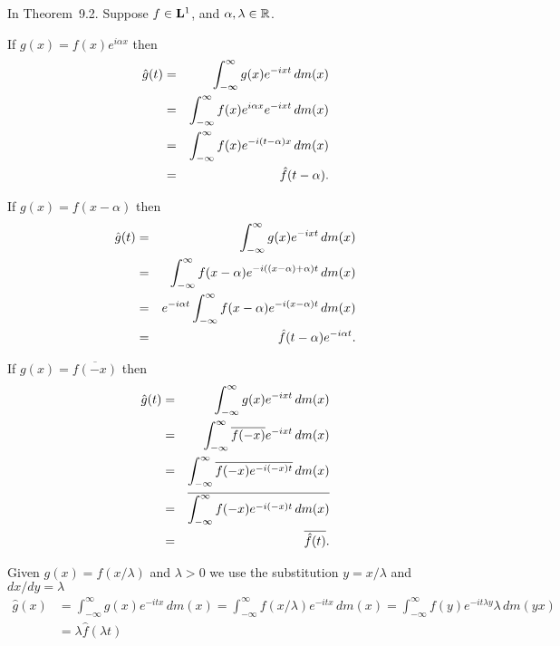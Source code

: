 \newcommand{\sqdivtpi}{\ensuremath{\frac{1}{\sqrt{2\pi}}}}
In Theorem~9.2.
Suppose \(f\in \mathbf{L}^{1}\), and \(\alpha,\lambda \in\mathbb{R}\).
\begin{itemize}

  If \(g(x)=f(x)e^{i\alpha x}\) then
    \begin{eqnarray*}
      \Hat{g}(t)
            & = & \int_{-\infty}^{\infty} g(x)e^{-ixt}\,dm(x) \\
            & = & \int_{-\infty}^{\infty} f(x)e^{i\alpha x}e^{-ixt}\,dm(x) \\
            & = & \int_{-\infty}^{\infty} f(x)e^{-i(t-\alpha)x}\,dm(x) \\
            & = & \Hat{f}(t-\alpha).
    \end{eqnarray*}

   If \(g(x)=f(x-\alpha)\) then
    \begin{eqnarray*}
      \Hat{g}(t)
            & = & \int_{-\infty}^{\infty} g(x)e^{-ixt}\,dm(x) \\
            & = & \int_{-\infty}^{\infty} f(x-\alpha)e^{-i((x-\alpha)+\alpha)t}\,dm(x) \\
            & = & e^{-i\alpha t}\int_{-\infty}^{\infty} f(x-\alpha)e^{-i(x-\alpha)t}\,dm(x) \\
            & = & \Hat{f}(t-\alpha)e^{-i\alpha t}.
    \end{eqnarray*}

   If \(g(x)=\overline{f(-x)}\) then
    \begin{eqnarray*}
      \Hat{g}(t)
            & = & \int_{-\infty}^{\infty} g(x)e^{-ixt}\,dm(x) \\
            & = & \int_{-\infty}^{\infty} \overline{f(-x)}e^{-ixt}\,dm(x) \\
            & = & \int_{-\infty}^{\infty} \overline{f(-x)e^{-i(-x)t}}\,dm(x) \\
            & = & \overline{\int_{-\infty}^{\infty} f(-x)e^{-i(-x)t}\,dm(x)} \\
            & = & \overline{\Hat{f}(t)}.
    \end{eqnarray*}

    Given \(g(x) = f(x/\lambda)\) and \(\lambda>0\)
    we use the substitution \(y=x/\lambda\) and \(dx/dy=\lambda\)
    \begin{align*}
    \widehat{g}(x)
     &= \int_{-\infty}^\infty g(x)e^{-itx}\,dm(x)
     = \int_{-\infty}^\infty f(x/\lambda)e^{-itx}\,dm(x) 
     = \int_{-\infty}^\infty f(y)e^{- it \lambda y}\lambda\,dm(yx) \\
     &= \lambda \widehat{f}(\lambda t)
    \end{align*}


\end{itemize}



